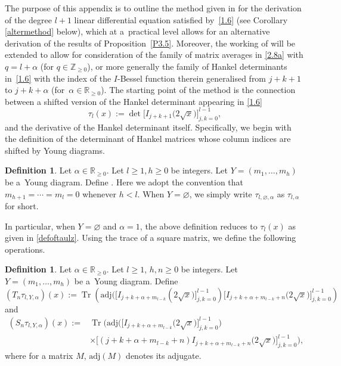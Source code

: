 \documentclass[pdftex]{sigma}
\numberwithin{equation}{section}
\theoremstyle{definition}
\newtheorem{Definition}[Theorem]{Definition}
\begin{document}
The purpose of this appendix is to outline the method given in \cite{KW24b} for the derivation of the degree $l+1$ linear differential equation satisfied by~\eqref{1.6} (see Corollary \ref{altermethod} below), which at a~practical level allows for an alternative derivation of the results of Proposition~\ref{P3.5}. Moreover, the working of \cite{KW24b} will be extended to allow for consideration of the family of matrix averages in \eqref{2.8a}
with $q=l+\alpha$ (for $q \in \mathbb Z_{\ge 0}$), or more generally
the family of Hankel determinants in~\eqref{1.6} with the index of the $I$-Bessel function therein generalised from $j+k+1$ to $j+k+\alpha$ (for~${\alpha \in \mathbb R_{\ge 0}}$).
The starting point of the method is the connection between a shifted version of the Hankel determinant appearing in \eqref{1.6}
\begin{equation}\label{defoftaulz}
\tau_{l}(x) := \det\!\big[I_{j+k+1}\bigl(2\sqrt{x}\bigr)\big]_{j,k=0}^{ l-1},
\end{equation}
and the derivative of the Hankel determinant itself. Specifically, we begin with the definition of the determinant of Hankel matrices whose column indices are shifted by Young diagrams.
\begin{Definition}
Let $\alpha\in \mathbb{R}_{\geq 0}$. Let $l\geq 1,h\geq 0$ be integers. Let $Y=(m_{1},\ldots,m_{h})$ be a~Young diagram. Define
.
Here we adopt the convention that~$m_{h+1}=\cdots=m_{l}=0$ whenever $h<l$. When $Y=\varnothing$, we simply write $\tau_{l,\varnothing,\alpha}$ as $\tau_{l,\alpha}$ for short.
\end{Definition}
In particular, when $Y=\varnothing$ and $\alpha=1$, the above definition reduces to $\tau_{l}(x)$ as given in \eqref{defoftaulz}.
Using the trace of a square matrix, we define the following operations.
\begin{Definition}
Let $\alpha\in \mathbb{R}_{\geq 0}$. Let $l\geq 1$, $h,n\geq 0$ be integers. Let $Y=(m_{1},\ldots,m_{h})$ be a~Young diagram. Define
\begin{equation*}
(T_{n}\tau_{l,Y,\alpha})(x):=\operatorname{Tr}\left(\mathrm{adj}\bigl(\big[I_{j+k+\alpha+m_{l-k}}(2\sqrt{x}\bigr)\big]_{j,k=0}^{ l-1})\big[I_{j+k+\alpha+m_{l-k}+n}\bigl(2\sqrt{x}\bigr) \big]_{j,k=0}^{ l-1}\right)
\end{equation*}
and
\begin{align*}
(S_{n}\tau_{l,Y,\alpha})(x):={}&\operatorname{Tr}\bigl(\mathrm{adj}\bigl(\big[I_{j+k+\alpha+m_{l-k}}\bigl(2\sqrt{x}\bigr) \big]_{j,k=0}^{ l-1}\bigr)\\
&\times\big[(j+k+\alpha+m_{l-k}+n)I_{j+k+\alpha+m_{l-k}+n}\bigl(2\sqrt{x}\bigr) \big]_{j,k=0}^{ l-1}\bigr),
\end{align*}
where for a matrix $M$, $\mathrm{adj}(M)$ denotes its adjugate.
\end{Definition}
\end{document}
